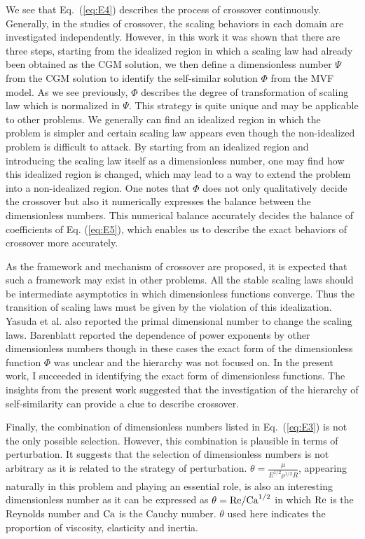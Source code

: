 \documentclass[default,iicol,10pt]{sn-jnl}%
\theoremstyle{thmstyleone}%
\theoremstyle{thmstyletwo}%
\theoremstyle{thmstylethree}%
\begin{document}
We see that Eq.~(\ref{eq:E4}) describes the process of crossover continuously. Generally, in the studies of crossover, the scaling behaviors in each domain are investigated independently. However, in this work it was shown that there are three steps, starting from the idealized region in which a scaling law had already been obtained as the CGM solution, we then define a dimensionless number $\Psi$ from the CGM solution to identify the self-similar solution $\Phi$ from the MVF model. As we see previously, $\Phi$ describes the degree of transformation of scaling law which is normalized in $\Psi$. This strategy is quite unique and may be applicable to other problems. We generally can find an idealized region in which the problem is simpler and certain scaling law appears even though the non-idealized problem is difficult to attack. By starting from an idealized region and introducing the scaling law itself as a dimensionless number, one may find how this idealized region is changed, which may lead to a way to extend the problem into a non-idealized region. One notes that $\Phi$ does not only qualitatively decide the crossover but also it numerically expresses the balance between the dimensionless numbers. This numerical balance accurately decides the balance of coefficients of Eq. (\ref{eq:E5}), which enables us to describe the exact behaviors of crossover more accurately.

As the framework and mechanism of crossover are proposed, it is expected that such a framework may exist in other problems. All the stable scaling laws should be intermediate asymptotics in which dimensionless functions converge. Thus the transition of scaling laws must be given by the violation of this idealization. Yasuda et al. also reported the primal dimensional number to change the scaling laws\cite{Yasuda2020}. Barenblatt reported the dependence of power exponents by other dimensionless numbers\cite{Barenblatt2002,Barenblatt1981} though in these cases the exact form of the dimensionless function $\Phi$ was unclear and the hierarchy was not focused on. In the present work, I succeeded in identifying the exact form of dimensionless functions. The insights from the present work suggested that the investigation of the hierarchy of self-similarity can provide a clue to describe crossover.

Finally, the combination of dimensionless numbers listed in Eq.~(\ref{eq:E3}) is not the only possible selection. However, this combination is plausible in terms of perturbation. It suggests that the selection of dimensionless numbers is not arbitrary as it is related to the strategy of perturbation. $\theta = \frac{\mu}{E^{1/2} \rho^{1/2} R}$, appearing naturally in this problem and playing an essential role, is also an interesting dimensionless number as it can be expressed as $\theta = {\rm Re}/{\rm Ca}^{1/2}$ in which ${\rm Re}$ is the Reynolds number and ${\rm Ca}$ is the Cauchy number. $\theta$ used here indicates the proportion of viscosity, elasticity and inertia. 
\end{document}

